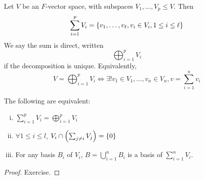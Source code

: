 \begin{definition}
Let \( V \) be an \( F \)-vector space, with subspaces \( V_1, \dots, V_p \leq V \).
Then
\[ \sum_{i=1}^p V_i = \qty{ v_1, \dots, v_\ell, v_i \in V_i, 1 \leq i \leq \ell} \]
We say the sum is direct, written
\[ \bigoplus_{i=1}^p V_i \]
if the decomposition is unique.
Equivalently,
\[ V = \bigoplus_{i=1}^p V_i \iff \exists! v_1 \in V_1, \dots, v_n \in V_n, v = \sum_{i=1}^n v_i \]
\end{definition}
\begin{lemma}
The following are equivalent:
\begin{enumerate}[(i)]
\item \( \sum_{i=1}^p V_i = \bigoplus_{i=1}^p V_i \)
\item \( \forall 1 \leq i \leq l \), \( V_i \cap \qty( \sum_{j \neq i} V_j ) = \{0\} \)
\item For any basis \( B_i \) of \( V_i \), \( B = \bigcup_{i=1}^n B_i \) is a basis of \( \sum_{i=1}^n V_i \).
\end{enumerate}
\end{lemma}
\begin{proof}
Exercise.
\end{proof}
